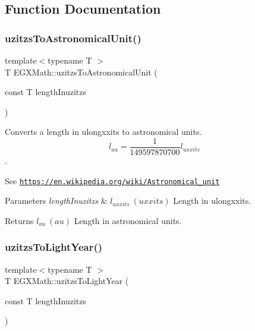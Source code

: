 \subsection{Function Documentation}
\mbox{\label{group___e_g_x_math-_conversions-_length_conversions-uzitzs-_astronomical_ga5b92a4634ad3e80173c05bc3ff39f079}} 
\subsubsection{\texorpdfstring{uzitzs\+To\+Astronomical\+Unit()}{uzitzsToAstronomicalUnit()}}
{\footnotesize\ttfamily template$<$typename T $>$ \\
T E\+G\+X\+Math\+::uzitzs\+To\+Astronomical\+Unit (\begin{DoxyParamCaption}\item[{const T}]{length\+Inuzitzs }\end{DoxyParamCaption})}



Converts a length in ulongxxits to astronomical units. \[ l_{au}= \frac{1}{149597870700} l_{uxxits} \]. 

See \href{https://en.wikipedia.org/wiki/Astronomical_unit}{\tt https\+://en.\+wikipedia.\+org/wiki/\+Astronomical\+\_\+unit} 
\begin{DoxyParams}{Parameters}
{\em length\+Inuzitzs} & $ l_{uxxits}\ (uxxits)$ Length in ulongxxits. \\
\hline
\end{DoxyParams}
\begin{DoxyReturn}{Returns}
$ l_{au}\ (au)$ Length in astronomical units. 
\end{DoxyReturn}
\mbox{\label{group___e_g_x_math-_conversions-_length_conversions-uzitzs-_astronomical_gaa6ada41d9c8a7516cb5fe8ab01976b27}} 
\subsubsection{\texorpdfstring{uzitzs\+To\+Light\+Year()}{uzitzsToLightYear()}}
{\footnotesize\ttfamily template$<$typename T $>$ \\
T E\+G\+X\+Math\+::uzitzs\+To\+Light\+Year (\begin{DoxyParamCaption}\item[{const T}]{length\+Inuzitzs }\end{DoxyParamCaption})}



